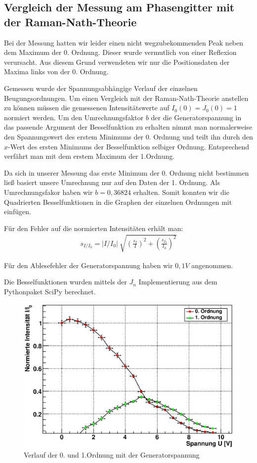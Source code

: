 \documentclass[12pt]{article}
\begin{document}
\subsection{Vergleich der Messung am Phasengitter mit der Raman-Nath-Theorie}
Bei der Messung hatten wir leider einen nicht wegzubekommenden Peak neben dem Maximum der 0. Ordnung. Dieser wurde vermutlich von einer Reflexion
verursacht. Aus diesem Grund verwendeten wir nur die Positionsdaten der Maxima links von der 0. Ordnung.

Gemessen wurde der Spannungsabhängige Verlauf der einzelnen Beugungsordnungen. Um einen Vergleich mit der Raman-Nath-Theorie anstellen zu können müssen
die gemessenen Intensitätswerte auf $I_0(0) = J_0(0) = 1$ normiert werden. Um den Umrechnungsfaktor $b$ der die Generatorspannung in das passende Argument
der Besselfunktion zu erhalten nimmt man normalerweise den Spannungswert des erstem Minimums der 0. Ordnung und teilt ihn durch den $x$-Wert des ersten
Minimums der Besselfunktion selbiger Ordnung. Entsprechend verfährt man mit dem erstem Maximum der 1.Ordnung. 

Da sich in unserer Messung das erste Minimum der 0. Ordnung nicht bestimmen ließ basiert unsere Umrechnung nur auf den Daten der 1. Ordnung.
Als Umrechnungsfakor haben wir $b = 0,36824$ erhalten. Somit konnten wir die Quadrierten Besselfunktionen in die Graphen der einzelnen Ordnungen mit 
einfügen.

Für den Fehler auf die normierten Intensitäten erhält man:
\begin{align}
 s_{I/I_0} = \lvert I/I_0 \rvert ~ \sqrt{\left(\frac{s_I}{I}\right)^2 + \left(\frac{s_{I_0}}{I_0}\right)^2}
\end{align}

Für den Ablesefehler der Generatorspannung haben wir $0,1V$ angenommen.

Die Besselfunktionen wurden mittels der $J_n$ Implementierung aus dem Pythonpaket SciPy berechnet.

\begin{figure}[H]  
\centering
\includegraphics[width=0.9\linewidth]{pictures/raman0+1o.eps}
\caption{Verlauf der 0. und 1.Ordnung mit der Generatorspannung}
\end{figure}
\end{document}
